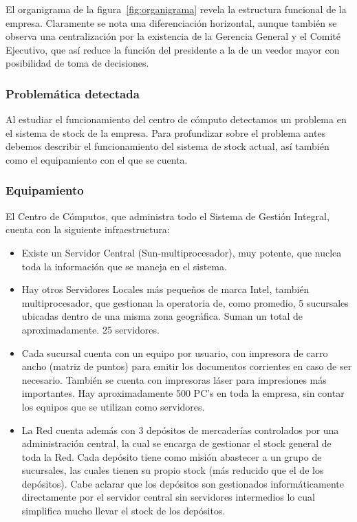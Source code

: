 El organigrama de la figura~\ref{fig:organigrama} revela la estructura
funcional de la empresa.  Claramente se nota una diferenciación horizontal,
aunque también se observa una centralización  por la existencia de la Gerencia
General y el Comité Ejecutivo, que así reduce la función del presidente a la de
un veedor mayor con posibilidad de toma de decisiones.


\subsubsection{Problemática detectada}

Al estudiar el funcionamiento del centro de cómputo detectamos un problema en
el sistema de stock de la empresa. Para profundizar sobre el problema antes
debemos describir el funcionamiento del sistema de stock actual, así también
como el equipamiento con el que se cuenta.


\subsubsection{Equipamiento}

El Centro de Cómputos, que administra todo el Sistema de Gestión Integral,
cuenta con la siguiente infraestructura:

\begin{itemize}

  \item Existe un Servidor Central (Sun-multiprocesador), muy potente, que
    nuclea toda la información que se maneja en el sistema.

  \item Hay otros Servidores Locales más pequeños de marca Intel, también
    multiprocesador, que gestionan la operatoria de, como promedio, 5 sucursales
    ubicadas dentro de una misma zona geográfica. Suman un total de aproximadamente. 25
    servidores.

  \item Cada sucursal cuenta con un equipo por usuario, con impresora de carro
    ancho (matriz de puntos) para emitir los documentos corrientes en caso de ser
    necesario. También se cuenta con impresoras láser para impresiones más
    importantes. Hay aproximadamente 500 PC’s en toda la empresa, sin contar los
    equipos que se utilizan como servidores.

  \item La Red cuenta además con 3 depósitos de mercaderías controlados por una
    administración central, la cual se encarga de gestionar el stock general de
    toda la Red. Cada depósito tiene como misión abastecer a un grupo de
    sucursales, las cuales tienen su propio stock (más reducido que el de los
    depósitos). Cabe aclarar que los depósitos son gestionados informáticamente
    directamente por el servidor central sin servidores intermedios lo cual
    simplifica mucho llevar el stock de los depósitos.

\end{itemize}


